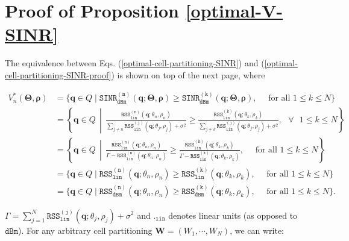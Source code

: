 \appendices
\section{Proof of Proposition \ref{optimal-V-SINR}}\label{Appendix_A}

The equivalence between Eqs. (\ref{optimal-cell-partitioning-SINR}) and  (\ref{optimal-cell-partitioning-SINR-proof}) is shown on top of the next page, where
\begin{figure*}[t!]
\begin{align}\label{optimal-cell-partitioning-SINR-proof}
    V_n^*(\bm{\Theta}, \bm{\rho}) &= \big\{\bm{q} \in Q \mid \mathtt{SINR_{dBm}^{(n)}}(\bm{q}; \bm{\Theta}, \bm{\rho}) \geq \mathtt{SINR_{dBm}^{(k)}}(\bm{q}; \bm{\Theta}, \bm{\rho}), \quad \textrm{ for all } 1 \leq k \leq N \big\} \\
    &= \left\{\bm{q} \in Q \,\middle\vert\,  \frac{\mathtt{RSS^{(n)}_{lin}} (\bm{q}; \theta_n, \rho_n)}{\sum\limits_{j\neq n}^{} \mathtt{RSS^{(j)}_{lin}} (\bm{q}; \theta_j, \rho_j) + \sigma^2} \geq \frac{\mathtt{RSS^{(k)}_{lin}} (\bm{q}; \theta_k, \rho_k)}{\sum\limits_{j\neq k}^{} \mathtt{RSS^{(j)}_{lin}} (\bm{q}; \theta_j, \rho_j) + \sigma^2}, \textrm{ } \forall \textrm{ } 1 \leq k \leq N \right\} \nonumber\\
    &= \left\{\bm{q} \in Q \,\middle\vert\, \frac{\mathtt{RSS^{(n)}_{lin}} (\bm{q}; \theta_n, \rho_n)}{\Gamma - \mathtt{RSS^{(n)}_{lin}} (\bm{q}; \theta_n, \rho_n)} \geq \frac{\mathtt{RSS^{(k)}_{lin}} (\bm{q}; \theta_k, \rho_k)}{\Gamma - \mathtt{RSS^{(k)}_{lin}} (\bm{q}; \theta_k, \rho_k)}, \quad \textrm{ for all } 1 \leq k \leq N \right\} \nonumber \\ 
    &= \big\{\bm{q} \in Q \mid \mathtt{RSS_{lin}^{(n)}}(\bm{q}; \theta_n, \rho_n) \geq \mathtt{RSS_{lin}^{(k)}}(\bm{q}; \theta_k, \rho_k), \quad \textrm{ for all } 1 \leq k \leq N \big\} \nonumber \\
    &= \big\{\bm{q} \in Q \mid \mathtt{RSS_{dBm}^{(n)}}(\bm{q}; \theta_n, \rho_n) \geq \mathtt{RSS_{dBm}^{(k)}}(\bm{q}; \theta_k, \rho_k), \quad \textrm{ for all } 1 \leq k \leq N \big\}.\nonumber
\end{align}
\end{figure*}
$\Gamma = \sum_{j=1}^{N} \mathtt{RSS^{(j)}_{lin}} (\bm{q}; \theta_j, \rho_j) + \sigma^2$ and $._{\mathtt{lin}}$ denotes linear units (as opposed to $\mathtt{dBm}$). %
For any arbitrary cell partitioning $\bm{W} = (W_1, \cdots, W_N)$, we can write:
